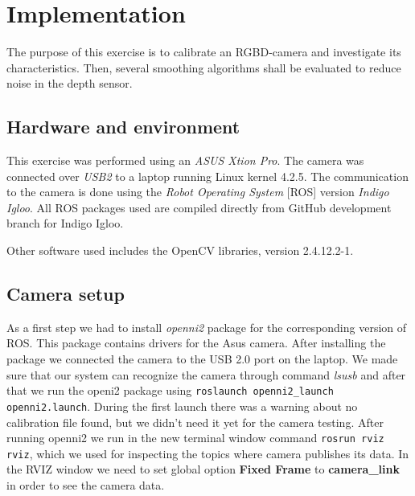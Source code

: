 \documentclass[11pt]{article}
\begin{document}
\section{Implementation}
The purpose of this exercise is to calibrate an RGBD-camera and investigate its characteristics. Then, several smoothing algorithms shall be evaluated to reduce noise in the depth sensor.
\subsection{Hardware and environment}
This exercise was performed using an \emph{ASUS Xtion Pro}. The camera was connected over \emph{USB2} to a laptop running Linux kernel 4.2.5. The communication to the camera is done using the \emph{Robot Operating System} [ROS] version \emph{Indigo Igloo}. All ROS packages used are compiled directly from GitHub development branch for Indigo Igloo. \par
Other software used includes the OpenCV libraries, version 2.4.12.2-1.
\subsection{Camera setup}
As a first step we had to install \emph{openni2} package for the corresponding version of ROS. This package contains drivers for the Asus camera. After installing the package we connected the camera to the USB 2.0 port on the laptop. We made sure that our system can recognize the camera through command \emph{lsusb} and after that we run the openi2 package using \texttt{roslaunch openni2\_launch openni2.launch}. During the first launch there was a warning about no calibration file found, but we didn't need it yet for the camera testing. After running openni2 we run in the new terminal window command \texttt{rosrun rviz rviz}, which we used for inspecting the topics where camera publishes its data. In the RVIZ window we need to set global option \textbf{Fixed Frame} to \textbf{camera\_link} in order to see the camera data. \par
\end{document}
